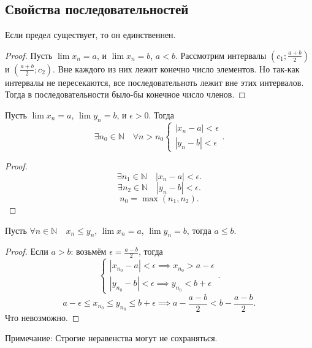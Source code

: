 \documentclass[11pt, oneside]{article}   	%
\begin{document}
        \subsection{Свойства последовательностей}
        \begin{theorem}
            Если предел существует, то он единственнен.
            \begin{proof}
                Пусть $\lim x_n =a$, и  $\lim x_n=b$,  $a<b$.
                Рассмотрим интервалы $\left( c_1; \frac{a+b}{2} \right) $ и $\left( \frac{a+b}{2}; c_2 \right) $. Вне каждого из них лежит конечно число элементов. Но так-как интервалы не пересекаются, все последовательноть лежит вне этих интервалов. Тогда в последовательности было-бы конечное число членов.
            \end{proof}
        \end{theorem}
        \begin{tlemma}
            Пусть $\lim x_n=a$,  $\lim y_n=b$, и  $\epsilon>0$. Тогда
            \[ \exists{n_0 \in \mathbb{N}}\quad \forall{n>n_0} 
                \begin{cases}
                    |x_n-a|<\epsilon\\
                    |y_n-b|<\epsilon
                \end{cases}
            .\]     
        \begin{proof}
            \[ \exists{n_1 \in \mathbb{N}}\quad |x_n-a|<\epsilon.\]
            \[ \exists{n_2 \in \mathbb{N}}\quad |y_n-b|<\epsilon .\]
            \[ n_0 = \max\left( n_1, n_2 \right)  .\] 
        \end{proof}
        \end{tlemma}
        \begin{theorem}
            Пусть $\forall{n \in \mathbb{N}}\quad x_n\le y_n$, $\lim x_n = a$,  $\lim y_n = b$, тогда  $a \le  b$.
             \begin{proof}
                 Если $a>b$: возьмём  $\epsilon=\frac{a-b}{2}$, тогда 
                 \[ \begin{cases}
                     |x_{n_0} - a| < \epsilon \implies x_{n_0} > a-\epsilon\\
                     |y_{n_0} - b| < \epsilon \implies y_{n_0}<b+\epsilon
                 \end{cases} .\] 
                 \[ a-\epsilon \le x_{n_0} \le y_{n_0} \le b+\epsilon \implies a-\frac{a-b}{2}<b-\frac{a-b}{2} .\]
                 Что невозможно.
             \end{proof}    
             Примечание: Строгие неравенства могут не сохраняться.
        \end{theorem}
\end{document}

